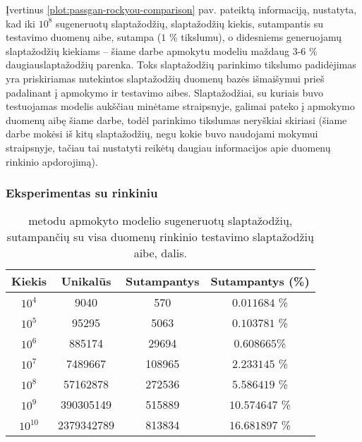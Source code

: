 \documentclass{VUMIFInfBakalaurinis}
\begin{document}
Įvertinus \ref{plot:passgan-rockyou-comparison} pav. pateiktą informaciją, 
nustatyta, kad iki $10^8$ sugeneruotų slaptažodžių, slaptažodžių kiekis, 
sutampantis su testavimo duomenų aibe, sutampa ($1$ \% tikslumu), o didesniems 
generuojamų slaptažodžių kiekiams -- šiame darbe apmokytu modeliu maždaug 
$3$-$6$ \% daugiauslaptažodžių parenka. Toks slaptažodžių parinkimo tikslumo 
padidėjimas yra priskiriamas nutekintos slaptažodžių duomenų bazės 
 išmaišymui prieš padalinant į apmokymo ir testavimo aibes. 
Slaptažodžiai, su kuriais buvo testuojamas modelis aukščiau minėtame 
straipsnyje, galimai pateko į apmokymo duomenų aibę šiame darbe, todėl parinkimo 
tikslumas neryškiai skiriasi (šiame darbe mokėsi iš kitų slaptažodžių, negu 
kokie buvo naudojami mokymui straipsnyje, tačiau tai nustatyti reikėtų daugiau 
informacijos apie duomenų rinkinio apdorojimą).

\subsubsection{Eksperimentas su  rinkiniu} %
\begin{table}[hb]
  \centering
  \caption{%
     metodu apmokyto modelio sugeneruotų slaptažodžių, 
    sutampančių su visa  duomenų rinkinio testavimo
    slaptažodžių aibe, dalis.
  }
  \begin{tabular}{|c|c|c|c|}
    \hline \textbf{Kiekis} & \textbf{Unikalūs} & \textbf{Sutampantys} & 
    \textbf{Sutampantys (\%)} \\
    \hline $10^4$ & 9040 & 570 & $0.011684$ \% \\
    \hline $10^5$ & 95295 & 5063 & $0.103781$ \% \\
    \hline $10^6$ & 885174 & 29694 & $0.608665$\% \\
    \hline $10^7$ & 7489667 & 108965 & $2.233145$ \% \\
    \hline $10^8$ & 57162878 & 272536 & $5.586419$ \% \\
    \hline $10^9$ & 390305149 & 515889 & $10.574647$ \% \\
    \hline $10^{10}$ & 2379342789 & 813834 & $16.681897$ \% \\
    \hline
  \end{tabular}
  \label{tab:passgan-linkedin-results}
\end{table}
\end{document}
